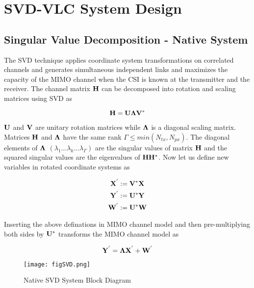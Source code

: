\section{SVD-VLC System Design}
\label{sec:svdvlc}
\graphicspath{{_System/figures_svdvlc/}}

\subsection{Singular Value Decomposition - Native System}
\label{subsec:svdvlcNative}
The SVD technique applies coordinate system transformations on correlated channels and generates simultaneous independent links and maximizes the capacity of the MIMO channel when the CSI is known at the transmitter and the receiver. The channel matrix $\bf{H}$ can be decomposed into rotation and scaling matrices using SVD as 

\begin{equation}
	\label{eqHsvd}
	\bf{H} = \bf{U}\bf{\Lambda}\bf{V}^{*}
\end{equation}

$\bf{U}$ and $\bf{V}$ are unitary rotation matrices while $\bf{\Lambda}$ is a diagonal scaling matrix. Matrices $\bf{H}$ and $\bf{\Lambda}$ have the same rank $\Gamma\leq min(N_{tx},N_{px})$. The diagonal elements of $\bf{\Lambda}$ $(\lambda_{1}...\lambda_{k}...\lambda_{\Gamma})$ are the singular values of matrix $\bf{H}$ and the squared singular values are the eigenvalues of ${\bf{H}}{\bf{H}}^{*}$. Now let us define new variables in rotated coordinate systems as

\begin{gather}
	\bf{X}^{'} := \bf{V}^{*}\bf{X}\\
	\bf{Y}^{'} := \bf{U}^{*}\bf{Y}\\
	\bf{W}^{'} := \bf{U}^{*}\bf{W}
\end{gather}

Inserting the above definations in MIMO channel model and then pre-multiplying both sides by $\bf{U}^{*}$ transforms the MIMO channel model as

\begin{equation}
	\label{eqSVDChannel}
	\bf{Y}^{'} = \bf{\Lambda}\bf{X}^{'} + \bf{W}^{'}
\end{equation}

\begin{figure}[!t]
	\centering
		\texttt{[image: figSVD.png]}
	\caption[Native SVD System Block Diagram]{Native SVD System Block Diagram\footnotemark}
	\label{fig:SVD}
\end{figure}

